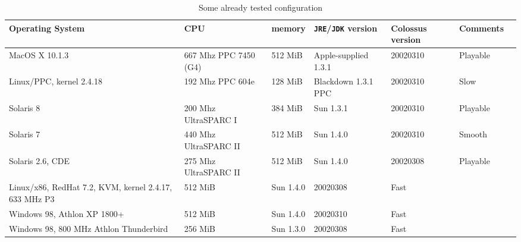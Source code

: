 \documentclass{article}
\begin{document}
\begin{table}
\begin{tabular}{|p{2.5cm}|p{2.5cm}|p{1.8cm}|p{2.5cm}|p{2.5cm}|p{1.8cm}|p{1.8cm}|}

\hline

\textbf{Operating System} & \textbf{CPU} & \textbf{memory} &  \textbf{\texttt{JRE}/\texttt{JDK} version} & \textbf{Colossus version} & \textbf{Comments}\\

\hline

MacOS X 10.1.3 & 667 Mhz PPC 7450 (G4) & 512 MiB & Apple-supplied 1.3.1 & 20020310 & Playable \\

\hline

Linux/PPC, kernel 2.4.18 & 192 Mhz PPC 604e & 128 MiB & Blackdown 1.3.1 PPC & 20020310 & Slow \\

\hline

Solaris 8 & 200 Mhz UltraSPARC I & 384 MiB & Sun 1.3.1 & 20020310 & Playable \\

\hline

Solaris 7 & 440 Mhz UltraSPARC II & 512 MiB & Sun 1.4.0 & 20020310 & Smooth \\

\hline

Solaris 2.6, CDE & 275 Mhz UltraSPARC II & 512 MiB & Sun 1.4.0 & 20020308 & Playable \\

\hline

Linux/x86, RedHat 7.2, KVM, kernel 2.4.17, 633 MHz P3 & 512 MiB & Sun 1.4.0 & 20020308 & Fast \\

\hline

Windows 98, Athlon XP 1800+ & 512 MiB & Sun 1.4.0 & 20020310 & Fast \\

\hline

Windows 98, 800 MHz Athlon Thunderbird & 256 MiB & Sun 1.3.0 & 20020308 & Fast \\

\hline

\end{tabular}
\caption{Some already tested configuration}
\label{TESTED}
\end{table}



\end{document}
